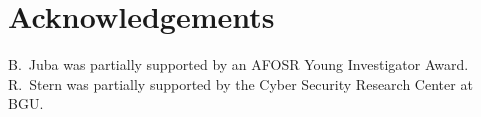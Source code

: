 \documentclass{article}
\begin{document}
	
	
	
	\section*{Acknowledgements}
	B.~Juba was partially supported by an AFOSR Young Investigator Award. 
	R.~Stern was partially supported by the Cyber Security Research Center 
	at BGU. 
	
	
	
	
\end{document}

